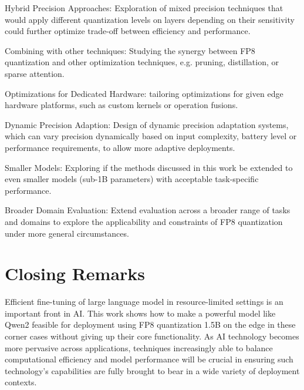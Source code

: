 Hybrid Precision Approaches: Exploration of mixed precision techniques that would apply different quantization levels on layers depending on their sensitivity could further optimize trade-off between efficiency and performance.
    
Combining with other techniques: Studying the synergy between FP8 quantization and other optimization techniques, e.g. pruning, distillation, or sparse attention.
    
Optimizations for Dedicated Hardware: tailoring optimizations for given edge hardware platforms, such as custom kernels or operation fusions.
    
Dynamic Precision Adaption: Design of dynamic precision adaptation systems, which can vary precision dynamically based on input complexity, battery level or performance requirements, to allow more adaptive deployments.
    
Smaller Models: Exploring if the methods discussed in this work be extended to even smaller models (sub-1B parameters) with acceptable task-specific performance.
    
Broader Domain Evaluation: Extend evaluation across a broader range of tasks and domains to explore the applicability and constraints of FP8 quantization under more general circumstances.
\section*{Closing Remarks}

Efficient fine-tuning of large language model in resource-limited settings is an important front in AI. This work shows how to make a powerful model like Qwen2 feasible for deployment using FP8 quantization 1.5B on the edge in these corner cases without giving up their core functionality. As AI technology becomes more pervasive across applications, techniques increasingly able to balance computational efficiency and model performance will be crucial in ensuring such technology's capabilities are fully brought to bear in a wide variety of deployment contexts.